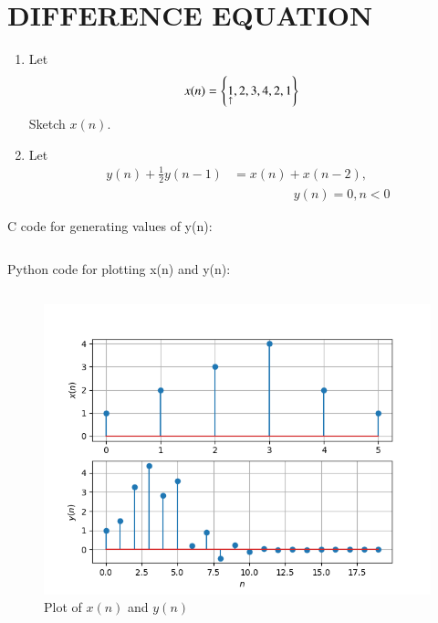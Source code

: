 \documentclass[journal,12pt,twocolumn]{IEEEtran}
\theoremstyle{remark}
\begin{document}
\section{DIFFERENCE EQUATION}
\begin{enumerate}[label=\thesection\arabic*.,ref=\thesection.\theenumi]
\item Let
\begin{align}
x(n) &= \left\{\underset{\uparrow}{1},2,3,4,2,1\right\}
\end{align}
Sketch $x(n)$.
\item Let 
\begin{align}
y(n) +\frac{1}{2}y(n-1) &= x(n) + x(n-2),\nonumber \\ 
& \hspace{2cm} y(n)=0, n<0
\end{align}
\end{enumerate}
\solution  C code for generating values of y(n):
\begin{lstlisting}
\end{lstlisting} 
Python code for plotting x(n) and y(n):
\begin{lstlisting}
\end{lstlisting}
\begin{figure}[ht]
	\centering
	\includegraphics[width=\columnwidth]{figs/xnyn}
	\caption{Plot of $x(n)$ and $y(n)$}
	\label{fig:xnyn}
\end{figure}
\end{document}
